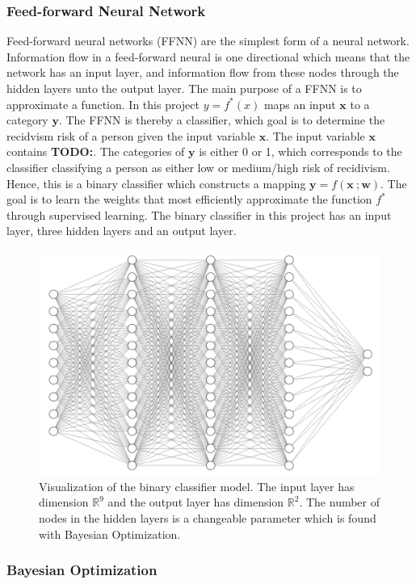 \documentclass[11pt, fleqn, titlepage]{article}
\begin{document}
	\subsubsection{Feed-forward Neural Network}
	Feed-forward neural networks (FFNN) are the simplest form of a neural network. Information flow in a feed-forward neural is one directional which means that the network has an input layer, and information flow from these nodes through the hidden layers unto the output layer. The main purpose of a FFNN is to approximate a function. In this project $ y = f^*(x) $ maps an input $ \mathbf x $ to a category $ \mathbf y $. The FFNN is thereby a classifier, which goal is to determine the recidvism risk of a person given the input variable $ \mathbf x $. The input variable $ \mathbf x $ contains \textbf{TODO:}. The categories of $ \mathbf y $ is either 0 or 1, which corresponds to the classifier classifying a person as either low or medium/high risk of recidivism. Hence, this is a binary classifier which constructs a mapping $ \mathbf y = f(\mathbf x \ ; \mathbf w) $. The goal is to learn the weights that most efficiently approximate the function $ f^* $ through supervised learning. The binary classifier in this project has an input layer, three hidden layers and an output layer. \cite{dl}
	
	\begin{figure}[H]
		\centering
		\includegraphics[width=0.5\linewidth]{imgs/ffnn}
		\caption{Visualization of the binary classifier model. The input layer has dimension $ \mathbb R ^9$ and the output layer has dimension $ \mathbb R^2 $. The number of nodes in the hidden layers is a changeable parameter which is found with Bayesian Optimization. }
		\label{fig:ffnn}
	\end{figure}
	
	
	\subsubsection{Bayesian Optimization}
	
\end{document}

